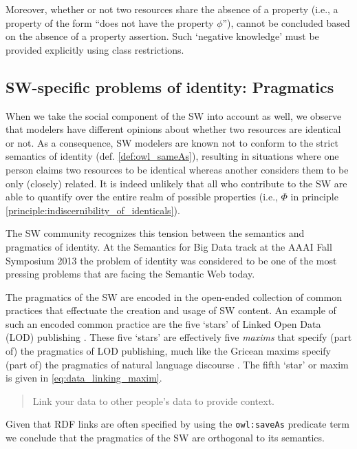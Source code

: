 Moreover, whether or not two resources share the absence of a property
  (i.e., a property of the form ``does not have the property $\phi$''),
  cannot be concluded based on the absence of a property assertion.
Such `negative knowledge' must be provided explicitly
  using class restrictions.

\subsection{SW-specific problems of identity: Pragmatics}

When we take the social component of the SW into account as well,
  we observe that modelers have different opinions about
  whether two resources are identical or not.
As a consequence, SW modelers are known not to conform to
  the strict semantics of identity (def. \ref{def:owl_sameAs}),
  resulting in situations where one person
  claims two resources to be identical
  whereas another considers them to be only (closely) related.
It is indeed unlikely that all who contribute to the SW
  are able to quantify over the entire realm of possible properties
  (i.e., $\Phi$ in principle \ref{principle:indiscernibility_of_identicals}).

The SW community recognizes this tension between
  the semantics and pragmatics of identity.
At the Semantics for Big Data track at the AAAI Fall Symposium 2013
  \cite{SemanticsBigData2013}
  the problem of identity was considered to be one of the most
  pressing problems that are facing the Semantic Web today.

The pragmatics of the SW are encoded in the open-ended collection of
  common practices that effectuate the creation and usage of SW content.
An example of such an encoded common practice are the five `stars'
  of Linked Open Data (LOD) publishing \cite{Bernerslee2010}.
These five `stars' are effectively five \emph{maxims} that specify
  (part of) the pragmatics of LOD publishing,
  much like the Gricean maxims specify
  (part of) the pragmatics of natural language discourse \cite{Grice1989}.
The fifth `star' or maxim is given in \ref{eq:data_linking_maxim}.
\begin{principle}
  \label{eq:data_linking_maxim}
  \begin{quote}
    Link your data to other people's data to provide context.
  \end{quote}
\end{principle}

\noindent Given that RDF links are often specified by using
  the \texttt{owl:saveAs} predicate term \cite{Void2011}
  we conclude that the pragmatics of the SW are orthogonal to its semantics.

